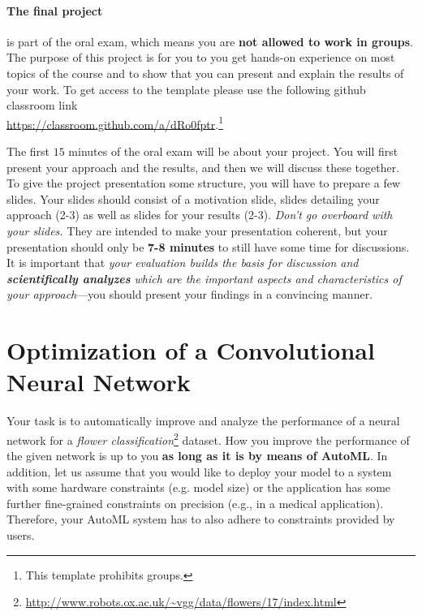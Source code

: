 \documentclass[10pt,a4paper]{article}
\begin{document}
	\paragraph{The final project} is part of the oral exam, which means you are \textbf{not allowed to work in groups}.
	The purpose of this project is for you to you get hands-on experience on most topics of the course and to show that you can present and explain the results of your work. 
	To get access to the template please use the following github classroom link\\ \url{https://classroom.github.com/a/dRo0fptr}.\footnote{This template prohibits groups.}

	The first $15$ minutes of the oral exam will be about your project. You will first present your approach and the results, and then we will discuss these together.
	To give the project presentation some structure, you will have to prepare a few slides.
	Your slides should consist of a motivation slide, slides detailing your approach (2-3) as well as slides for your results (2-3).
	\textit{Don't go overboard with your slides.}
	They are intended to make your presentation coherent, but your presentation should only be \textbf{7-8 minutes} to still have some time for discussions. %
	It is important that \textit{your evaluation builds the basis for discussion and \textbf{scientifically analyzes} which are the important aspects and characteristics of your approach}---you should present your findings in a convincing manner.
	
	\section*{Optimization of a Convolutional Neural Network}
		
		Your task is to automatically improve and analyze the performance of a neural network for a \emph{flower classification}\footnote{\url{http://www.robots.ox.ac.uk/~vgg/data/flowers/17/index.html}} dataset.
		How you improve the performance of the given network is up to you \textbf{as long as it is by means of AutoML}. In addition, let us assume that you would like to deploy your model to a system with some hardware constraints (e.g. model size) or the application has some further fine-grained constraints on precision (e.g., in a medical application). Therefore, your AutoML system has to also adhere to constraints provided by users.
		
\end{document}
